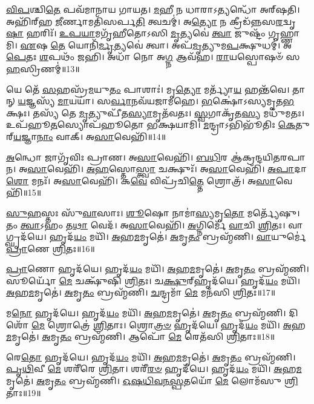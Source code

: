    \ul{𑌵𑌿}\-\-\ul{𑌪}\-𑌶𑍍𑌚𑌿\-\ul{𑌤𑍇} 𑌪𑌵᳴𑌮𑌾𑌨𑌾𑌯 𑌗𑌾𑌯𑌤।
   \ul{𑌮}\-𑌹𑍀 𑌨 𑌧𑌾𑌰𑌾𑌽𑌤𑍍𑌯𑌨𑍍𑌧𑍋᳴ 𑌅𑌰𑍍{‌}𑌷𑌤𑌿।
   𑌅𑌹𑌿᳴𑌰𑍍{‌}𑌹 \ul{𑌜𑍀}\-𑌰𑍍𑌣𑌾𑌮𑌤𑌿᳴𑌸𑌰𑍍𑌪\-\ul{𑌤𑌿} 𑌤𑍍𑌵𑌚𑌮𑍍॑।
   𑌅\-\ul{𑌤𑍍𑌯𑍋} 𑌨 𑌕𑍍𑌰𑍀𑌡᳴𑌨𑍍𑌨𑌸\-\ul{𑌰}\-𑌦𑍍𑌵𑍃\-\ul{𑌷𑌾} 𑌹𑌰𑌿𑌃᳴।
   \ul{𑌉}\-\-\ul{𑌪}\-\-\ul{𑌯𑌾}\-𑌮𑌗𑍃᳴𑌹𑍀𑌤𑍋𑌽𑌸𑌿 \ul{𑌮𑍃}\-𑌤𑍍𑌯𑌵𑍇॑ \ul{𑌤𑍍𑌵𑌾} 𑌜𑍁𑌷𑍍𑌟𑌂᳴ 𑌗𑍃𑌹𑍍𑌣𑌾𑌮𑌿।
   \ul{𑌏}\-𑌷 \ul{𑌤𑍇} 𑌯𑍋𑌨𑌿᳴\-\ul{𑌰𑍍𑌮𑍃}\-𑌤𑍍𑌯𑌵𑍇॑ 𑌤𑍍𑌵𑌾।
   𑌅𑌪᳴\-\ul{𑌮𑍃}\-𑌤𑍍𑌯𑍁𑌮\-\ul{𑌪}\-𑌕𑍍𑌷𑍁𑌧𑌮𑍍॑।
   𑌅\-\ul{𑌪𑍇}\-𑌤𑌃 \ul{𑌶}\-𑌪𑌥𑌂᳴ 𑌜𑌹𑌿।
   𑌅𑌧𑌾᳴ 𑌨𑍋 𑌅\-\ul{𑌗𑍍𑌨} 𑌆𑌵᳴𑌹।
   \ul{𑌰𑌾}\-𑌯𑌸𑍍𑌪𑍋𑌷𑍞᳴ 𑌸\-\ul{𑌹}\-𑌸𑍍𑌰𑌿𑌣𑌮𑍍॑॥13॥

   𑌯𑍇 𑌤𑍇᳴ \ul{𑌸}\-𑌹𑌸𑍍𑌰᳴\-\ul{𑌮}\-𑌯𑍁\-\ul{𑌤𑌂} 𑌪𑌾𑌶𑌾𑌃॑।
   𑌮𑍃\-\ul{𑌤𑍍𑌯𑍋} 𑌮𑌰𑍍𑌤𑍍𑌯𑌾᳴\-\ul{𑌯} 𑌹𑌨𑍍𑌤᳴𑌵𑍇।
   𑌤𑌾𑌨𑍍 \ul{𑌯}\-𑌜𑍍𑌞𑌸𑍍𑌯᳴ \ul{𑌮𑌾}\-𑌯𑌯𑌾॑।
   𑌸\-\ul{𑌰𑍍𑌵𑌾}\-𑌨𑌵᳴𑌯𑌜𑌾𑌮𑌹𑍇।
   \ul{𑌭}\-𑌕𑍍𑌷𑍋॑𑌽𑌸𑍍𑌯𑌮𑍃𑌤\-\ul{𑌭}\-𑌕𑍍𑌷𑌃।
   𑌤𑌸𑍍𑌯᳴ 𑌤𑍇 \ul{𑌮𑍃}\-𑌤𑍍𑌯𑍁𑌪𑍀᳴𑌤\-\ul{𑌸𑍍𑌯𑌾}\-𑌮𑍃𑌤᳴𑌵𑌤𑌃।
   \ul{𑌸𑍍𑌵}\-𑌗𑌾𑌕𑍃᳴𑌤\-\ul{𑌸𑍍𑌯} 𑌮𑌧𑍁᳴𑌮𑌤𑌃।
   𑌉𑌪᳴𑌹𑍂\-\ul{𑌤}\-𑌸𑍍𑌯𑍋𑌪᳴𑌹𑍂𑌤𑍋 𑌭𑌕𑍍𑌷𑌯𑌾𑌮𑌿।
   \ul{𑌮}\-𑌨𑍍𑌦𑍍𑌰𑌾𑌽𑌭𑌿𑌭𑍂᳴𑌤𑌿𑌃 \ul{𑌕𑍇}\-𑌤𑍁𑌰𑍍{‌}\-\ul{𑌯}\-𑌜𑍍𑌞𑌾\-\ul{𑌨𑌾𑌂} 𑌵𑌾𑌕𑍍।
   𑌅\-\ul{𑌸𑌾}\-𑌵𑍇𑌹𑌿᳴॥14॥

   \ul{𑌅}\-𑌨𑍍𑌧𑍋 𑌜𑌾𑌗𑍃᳴𑌵𑌿𑌃 𑌪𑍍𑌰𑌾𑌣।
   𑌅\-\ul{𑌸𑌾}\-𑌵𑍇𑌹𑌿᳴।
   \ul{𑌬}\-\-\ul{𑌧𑌿}\-𑌰 𑌆॑𑌕𑍍𑌰𑌨𑍍𑌦𑌯𑌿𑌤𑌰𑌪𑌾𑌨।
   𑌅\-\ul{𑌸𑌾}\-𑌵𑍇𑌹𑌿᳴।
   \ul{𑌅}\-\-\ul{𑌹}\-𑌸𑍍𑌤𑍋\-\ul{𑌸𑍍𑌤𑍍𑌵𑌾} 𑌚𑌕𑍍𑌷𑍁𑌃᳴।
   𑌅\-\ul{𑌸𑌾}\-𑌵𑍇𑌹𑌿᳴।
   \ul{𑌅}\-\-\ul{𑌪𑌾}\-𑌦𑌾\-\ul{𑌶𑍋} 𑌮𑌨𑌃᳴।
   𑌅\-\ul{𑌸𑌾}\-𑌵𑍇𑌹𑌿᳴।
   𑌕\-\ul{𑌵𑍇} 𑌵𑌿𑌪𑍍𑌰᳴𑌚𑌿\-\ul{𑌤𑍍𑌤𑍇} 𑌶𑍍𑌰𑍋𑌤𑍍𑌰᳴।
   𑌅\-\ul{𑌸𑌾}\-𑌵𑍇𑌹𑌿᳴॥15॥

   \ul{𑌸𑍁}\-\-\ul{𑌹}\-𑌸𑍍𑌤𑌃 𑌸𑍁᳴\-\ul{𑌵𑌾}\-𑌸𑌾𑌃।
   \ul{𑌶𑍂}\-𑌷𑍋 𑌨𑌾𑌮𑌾॑\-\ul{𑌸𑍍𑌯}\-𑌮𑍃\-\ul{𑌤𑍋} 𑌮𑌰𑍍𑌤𑍍𑌯𑍇᳴𑌷𑍁।
   𑌤𑌂 \ul{𑌤𑍍𑌵𑌾}\-𑌽𑌹𑌂 𑌤\-\ul{𑌥𑌾} 𑌵𑍇𑌦᳴।
   𑌅\-\ul{𑌸𑌾}\-𑌵𑍇𑌹𑌿᳴।
   \ul{𑌅}\-𑌗𑍍𑌨𑌿𑌰𑍍𑌮𑍇᳴ \ul{𑌵𑌾}\-𑌚𑌿 \ul{𑌶𑍍𑌰𑌿}\-𑌤𑌃।
   𑌵𑌾𑌗𑍍𑌘𑍃𑌦᳴𑌯𑍇।
   𑌹𑍃𑌦᳴\-\ul{𑌯𑌂} 𑌮𑌯𑌿᳴।
   \ul{𑌅}\-𑌹\-\ul{𑌮}\-𑌮𑍃𑌤𑍇॑।
   \ul{𑌅}\-𑌮𑍃\-\ul{𑌤𑌂} 𑌬𑍍𑌰𑌹𑍍𑌮᳴𑌣𑌿।
   \ul{𑌵𑌾}\-𑌯𑍁𑌰𑍍𑌮𑍇॑ \ul{𑌪𑍍𑌰𑌾}\-𑌣𑍇 \ul{𑌶𑍍𑌰𑌿}\-𑌤𑌃॥16॥

   \ul{𑌪𑍍𑌰𑌾}\-𑌣𑍋 𑌹𑍃𑌦᳴𑌯𑍇।
   𑌹𑍃𑌦᳴\-\ul{𑌯𑌂} 𑌮𑌯𑌿᳴।
   \ul{𑌅}\-𑌹\-\ul{𑌮}\-𑌮𑍃𑌤𑍇॑।
   \ul{𑌅}\-𑌮𑍃\-\ul{𑌤𑌂} 𑌬𑍍𑌰𑌹𑍍𑌮᳴𑌣𑌿।
   𑌸𑍂𑌰𑍍𑌯𑍋᳴ \ul{𑌮𑍇} 𑌚𑌕𑍍𑌷𑍁᳴𑌷𑌿 \ul{𑌶𑍍𑌰𑌿}\-𑌤𑌃।
   𑌚\-\ul{𑌕𑍍𑌷𑍁}\-𑌰𑍍{‌}𑌹𑍃𑌦᳴𑌯𑍇।
   𑌹𑍃𑌦᳴\-\ul{𑌯𑌂} 𑌮𑌯𑌿᳴।
   \ul{𑌅}\-𑌹\-\ul{𑌮}\-𑌮𑍃𑌤𑍇॑।
   \ul{𑌅}\-𑌮𑍃\-\ul{𑌤𑌂} 𑌬𑍍𑌰𑌹𑍍𑌮᳴𑌣𑌿।
   \ul{𑌚}\-𑌨𑍍𑌦𑍍𑌰𑌮𑌾᳴ \ul{𑌮𑍇} 𑌮𑌨᳴𑌸𑌿 \ul{𑌶𑍍𑌰𑌿}\-𑌤𑌃॥17॥

   𑌮\-\ul{𑌨𑍋} 𑌹𑍃𑌦᳴𑌯𑍇।
   𑌹𑍃𑌦᳴\-\ul{𑌯𑌂} 𑌮𑌯𑌿᳴।
   \ul{𑌅}\-𑌹\-\ul{𑌮}\-𑌮𑍃𑌤𑍇॑।
   \ul{𑌅}\-𑌮𑍃\-\ul{𑌤𑌂} 𑌬𑍍𑌰𑌹𑍍𑌮᳴𑌣𑌿।
   𑌦𑌿𑌶𑍋᳴ \ul{𑌮𑍇} 𑌶𑍍𑌰𑍋𑌤𑍍𑌰𑍇॑ \ul{𑌶𑍍𑌰𑌿}\-𑌤𑌾𑌃।
   𑌶𑍍𑌰𑍋\-\ul{𑌤𑍍𑌰}\-\-\ul{𑍞} 𑌹𑍃𑌦᳴𑌯𑍇।
   𑌹𑍃𑌦᳴\-\ul{𑌯𑌂} 𑌮𑌯𑌿᳴।
   \ul{𑌅}\-𑌹\-\ul{𑌮}\-𑌮𑍃𑌤𑍇॑।
   \ul{𑌅}\-𑌮𑍃\-\ul{𑌤𑌂} 𑌬𑍍𑌰𑌹𑍍𑌮᳴𑌣𑌿।
   𑌆𑌪𑍋᳴ \ul{𑌮𑍇} 𑌰𑍇𑌤᳴𑌸𑌿 \ul{𑌶𑍍𑌰𑌿}\-𑌤𑌾𑌃॥18॥

   𑌰𑍇\-\ul{𑌤𑍋} 𑌹𑍃𑌦᳴𑌯𑍇।
   𑌹𑍃𑌦᳴\-\ul{𑌯𑌂} 𑌮𑌯𑌿᳴।
   \ul{𑌅}\-𑌹\-\ul{𑌮}\-𑌮𑍃𑌤𑍇॑।
   \ul{𑌅}\-𑌮𑍃\-\ul{𑌤𑌂} 𑌬𑍍𑌰𑌹𑍍𑌮᳴𑌣𑌿।
   \ul{𑌪𑍃}\-\-\ul{𑌥𑌿}\-𑌵𑍀 \ul{𑌮𑍇} 𑌶𑌰𑍀᳴𑌰𑍇 \ul{𑌶𑍍𑌰𑌿}\-𑌤𑌾।
   𑌶𑌰𑍀᳴\-\ul{𑌰}\-\-\ul{𑍞} 𑌹𑍃𑌦᳴𑌯𑍇।
   𑌹𑍃𑌦᳴\-\ul{𑌯𑌂} 𑌮𑌯𑌿᳴।
   \ul{𑌅}\-𑌹\-\ul{𑌮}\-𑌮𑍃𑌤𑍇॑।
   \ul{𑌅}\-𑌮𑍃\-\ul{𑌤𑌂} 𑌬𑍍𑌰𑌹𑍍𑌮᳴𑌣𑌿।
   \ul{𑌓}\-\-\ul{𑌷}\-\-\ul{𑌧𑌿}\-\-\ul{𑌵}\-\-\ul{𑌨}\-\-\ul{𑌸𑍍𑌪}\-𑌤𑌯𑍋᳴ \ul{𑌮𑍇} 𑌲𑍋𑌮᳴𑌸𑍁 \ul{𑌶𑍍𑌰𑌿}\-𑌤𑌾𑌃॥19॥

